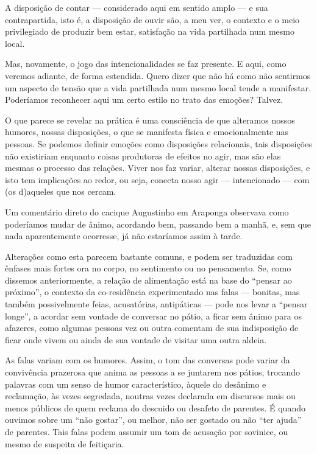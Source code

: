 A disposição de contar — considerado aqui em sentido amplo — e sua
contrapartida, isto é, a disposição de ouvir são, a meu ver, o contexto
e o meio privilegiado de produzir bem estar, satisfação na vida
partilhada num mesmo local.

Mas, novamente, o jogo das intencionalidades se faz presente. E aqui, como
veremos adiante, de forma estendida. Quero dizer que não há como não
sentirmos um aspecto de tensão que a vida partilhada num mesmo local
tende a manifestar. Poderíamos reconhecer aqui um certo estilo no trato
das emoções? Talvez.

O que parece se revelar na prática é uma consciência de que alteramos
nossos humores, nossas disposições, o que se manifesta física e
emocionalmente nas pessoas. Se podemos definir emoções como disposições
relacionais, tais disposições não existiriam enquanto coisas produtoras
de efeitos no agir, mas são elas mesmas o processo das relações. Viver
nos faz variar, alterar nossas disposições, e isto tem implicações ao
redor, ou seja, conecta nosso agir — intencionado — com (os d)aqueles
que nos cercam. 

Um comentário direto do cacique Augustinho em Araponga observava como
poderíamos mudar de ânimo, acordando bem, passando bem a manhã, e, sem
que nada aparentemente ocorresse, já não estaríamos assim à tarde.

Alterações como esta parecem bastante comuns, e podem ser traduzidas com
ênfases mais fortes ora no corpo, no sentimento ou no pensamento. Se,
como dissemos anteriormente, a relação de alimentação está na base do
``pensar ao próximo'', o contexto da co-residência experimentado nas
falas — bonitas, mas também possivelmente feias, acusatórias,
antipáticas — pode nos levar a ``pensar longe'', a acordar sem vontade de
conversar no pátio, a ficar sem ânimo para os afazeres, como
algumas pessoas vez ou outra comentam de sua indisposição de ficar onde
vivem ou ainda de sua vontade de visitar uma outra aldeia.

As falas variam com os humores. Assim, o tom das conversas pode variar
da convivência prazerosa que anima as pessoas a se juntarem nos pátios,
trocando palavras com um senso de humor característico, àquele do
desânimo e reclamação, às vezes segredada, noutras vezes declarada em
discursos mais ou menos públicos de quem reclama do descuido ou
desafeto de parentes. É quando ouvimos sobre um ``não gostar'', ou
melhor, não ser gostado ou não ``ter ajuda'' de parentes. Tais falas
podem assumir um tom de acusação por sovinice, ou mesmo de suspeita de
feitiçaria.


